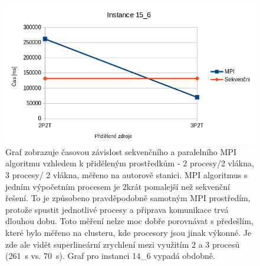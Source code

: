 \documentclass{article}%
\begin{document}
\begin{figure}[H]%
    \centering%
    \includegraphics[width=1\linewidth]{images/mpi_15_6.png}%
    \caption{Graf zobrazuje časovou závislost sekvenčního a paralelního MPI algoritmu vzhledem k přiděleným prostředkům - 2 procesy/2 vlákna, 3 procesy/ 2 vlákna, měřeno na autorově stanici. MPI algoritmus s jedním výpočetním procesem je 2krát pomalejší než sekvenční řešení. To je způsobeno pravděpodobně samotným MPI prostředím, protože spustit jednotlivé procesy a připrava komunikace trvá dlouhou dobu. Toto měření nelze moc dobře porovnávat s předešlím, které bylo měřeno na clusteru, kde procesory jsou jinak výkonné. Je zde ale vidět superlineární zrychlení mezi využitím 2 a 3 procesů (261~s vs. 70~s). Graf pro instanci 14\_6 vypadá obdobně.}%
\end{figure}
\end{document}
